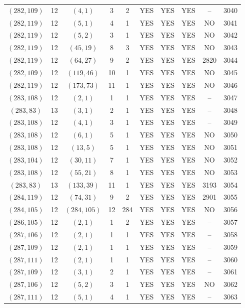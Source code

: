 \begin{longtable}{|c|c|c|c|c|c|c|c|c|c|}
$(282, 109)$ & 12 & $(4, 1)$ & 3 & 2 & YES & YES & YES & -- & 3040\\
$(282, 119)$ & 12 & $(5, 1)$ & 4 & 1 & YES & YES & YES & NO & 3041\\
$(282, 119)$ & 12 & $(5, 2)$ & 3 & 1 & YES & YES & YES & NO & 3042\\
$(282, 119)$ & 12 & $(45, 19)$ & 8 & 3 & YES & YES & YES & NO & 3043\\
$(282, 119)$ & 12 & $(64, 27)$ & 9 & 2 & YES & YES & YES & 2820 & 3044\\
$(282, 109)$ & 12 & $(119, 46)$ & 10 & 1 & YES & YES & YES & NO & 3045\\
$(282, 119)$ & 12 & $(173, 73)$ & 11 & 1 & YES & YES & YES & NO & 3046\\
$(283, 108)$ & 12 & $(2, 1)$ & 1 & 1 & YES & YES & YES & -- & 3047\\
$(283, 83)$ & 13 & $(3, 1)$ & 2 & 1 & YES & YES & YES & -- & 3048\\
$(283, 108)$ & 12 & $(4, 1)$ & 3 & 1 & YES & YES & YES & -- & 3049\\
$(283, 108)$ & 12 & $(6, 1)$ & 5 & 1 & YES & YES & YES & NO & 3050\\
$(283, 108)$ & 12 & $(13, 5)$ & 5 & 1 & YES & YES & YES & NO & 3051\\
$(283, 104)$ & 12 & $(30, 11)$ & 7 & 1 & YES & YES & YES & NO & 3052\\
$(283, 108)$ & 12 & $(55, 21)$ & 8 & 1 & YES & YES & YES & NO & 3053\\
$(283, 83)$ & 13 & $(133, 39)$ & 11 & 1 & YES & YES & YES & 3193 & 3054\\
$(284, 119)$ & 12 & $(74, 31)$ & 9 & 2 & YES & YES & YES & 2901 & 3055\\
$(284, 105)$ & 12 & $(284, 105)$ & 12 & 284 & YES & YES & YES & NO & 3056\\
$(286, 105)$ & 12 & $(2, 1)$ & 1 & 2 & YES & YES & YES & -- & 3057\\
$(287, 106)$ & 12 & $(2, 1)$ & 1 & 1 & YES & YES & YES & -- & 3058\\
$(287, 109)$ & 12 & $(2, 1)$ & 1 & 1 & YES & YES & YES & -- & 3059\\
$(287, 111)$ & 12 & $(2, 1)$ & 1 & 1 & YES & YES & YES & -- & 3060\\
$(287, 109)$ & 12 & $(3, 1)$ & 2 & 1 & YES & YES & YES & -- & 3061\\
$(287, 106)$ & 12 & $(5, 2)$ & 3 & 1 & YES & YES & YES & NO & 3062\\
$(287, 111)$ & 12 & $(5, 1)$ & 4 & 1 & YES & YES & YES & -- & 3063\\

\end{longtable}
